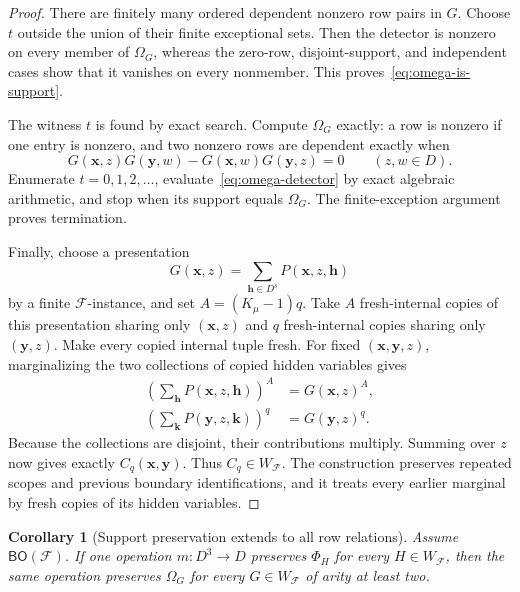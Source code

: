 \documentclass[11pt]{article}
\theoremstyle{plain}
\newtheorem{corollary}[corollary]{Corollary}
\theoremstyle{definition}
\theoremstyle{remark}
\newcommand{\cF}{\mathcal F}
\newcommand{\BO}{\mathsf{BO}}
\newcommand{\SuppRel}[1]{\Phi_{#1}}
\newcommand{\RowEq}[1]{\Omega_{#1}}
\begin{document}
\begin{proof}
There are finitely many ordered dependent nonzero row pairs in $G$.  Choose
$t$ outside the union of their finite exceptional sets.  Then the detector
is nonzero on every member of $\RowEq G$, whereas the zero-row,
disjoint-support, and independent cases show that it vanishes on every
nonmember.  This proves~\eqref{eq:omega-is-support}.

The witness $t$ is found by exact search.  Compute $\RowEq G$ exactly: a row
is nonzero if one entry is nonzero, and two
nonzero rows are dependent exactly when
\begin{equation*}
  G(\mathbf x,z)G(\mathbf y,w)
  -G(\mathbf x,w)G(\mathbf y,z)=0
  \qquad(z,w\in D).
\end{equation*}
Enumerate $t=0,1,2,\ldots$, evaluate~\eqref{eq:omega-detector} by exact
algebraic arithmetic, and stop when its support equals $\RowEq G$.  The
finite-exception argument proves termination.

Finally, choose a presentation
\[
  G(\mathbf x,z)
   =\sum_{\mathbf h\in D^s}P(\mathbf x,z,\mathbf h)
\]
by a finite $\cF$-instance, and set $A=(K_\mu-1)q$.  Take $A$
fresh-internal copies of this presentation sharing only $(\mathbf x,z)$ and
$q$ fresh-internal copies sharing only $(\mathbf y,z)$.  Make every copied
internal tuple fresh.  For fixed $(\mathbf x,\mathbf y,z)$, marginalizing
the two collections of copied hidden variables gives
\begin{align*}
  \left(\sum_{\mathbf h}P(\mathbf x,z,\mathbf h)\right)^A
    &=G(\mathbf x,z)^A,\\
  \left(\sum_{\mathbf k}P(\mathbf y,z,\mathbf k)\right)^q
    &=G(\mathbf y,z)^q.
\end{align*}
Because the collections are disjoint, their contributions multiply.
Summing over $z$ now gives exactly $C_q(\mathbf x,\mathbf y)$.
Thus $C_q\in W_{\cF}$.  The construction preserves repeated scopes and
previous boundary identifications, and it treats every earlier marginal by
fresh copies of its hidden variables.
\end{proof}

\begin{corollary}[Support preservation extends to all row relations]
\label{cor:omega-reduces-to-supports}
Assume $\BO(\cF)$.  If one operation $m:D^3\to D$ preserves $\SuppRel H$
for every $H\in W_{\cF}$, then the same operation preserves $\RowEq G$ for
every $G\in W_{\cF}$ of arity at least two.
\end{corollary}
\end{document}
